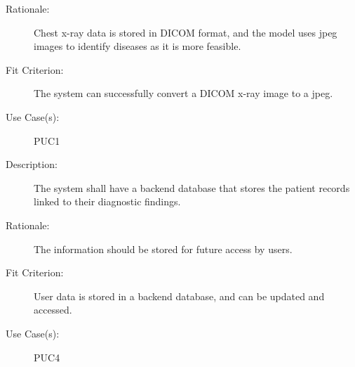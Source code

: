 \documentclass[12pt]{article}
\begin{document}
\begin{enumerate}[label=FR\arabic*., series=frs]
\begin{item}
\begin{description}
            \item[Rationale:] Chest x-ray data is stored in DICOM format, and the model uses jpeg images to identify diseases as it is more feasible.
            \item[Fit Criterion:] The system can successfully convert a DICOM x-ray image to a jpeg.
            \item[Use Case(s):] PUC1
        \end{description}
    \end{item}
    \begin{item}
        \begin{description}
            \item[Description:] The system shall have a backend database that stores the patient records linked to their diagnostic findings.
            \item[Rationale:] The information should be stored for future access by users.
            \item[Fit Criterion:] User data is stored in a backend database, and can be updated and accessed.
            \item[Use Case(s):] PUC4
        \end{description}
    \end{item}
    \begin{item}
        \begin{description}
            

\end{description}
\end{item}
\end{enumerate}
\end{document}
